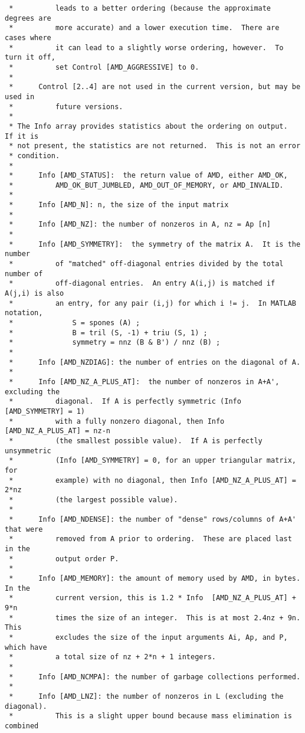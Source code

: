 \documentclass[11pt]{article}
\begin{document}
{\begin{verbatim}
 *          leads to a better ordering (because the approximate degrees are
 *          more accurate) and a lower execution time.  There are cases where
 *          it can lead to a slightly worse ordering, however.  To turn it off,
 *          set Control [AMD_AGGRESSIVE] to 0.
 *
 *      Control [2..4] are not used in the current version, but may be used in
 *          future versions.
 *
 * The Info array provides statistics about the ordering on output.  If it is
 * not present, the statistics are not returned.  This is not an error
 * condition.
 * 
 *      Info [AMD_STATUS]:  the return value of AMD, either AMD_OK,
 *          AMD_OK_BUT_JUMBLED, AMD_OUT_OF_MEMORY, or AMD_INVALID.
 *
 *      Info [AMD_N]: n, the size of the input matrix
 *
 *      Info [AMD_NZ]: the number of nonzeros in A, nz = Ap [n]
 *
 *      Info [AMD_SYMMETRY]:  the symmetry of the matrix A.  It is the number
 *          of "matched" off-diagonal entries divided by the total number of
 *          off-diagonal entries.  An entry A(i,j) is matched if A(j,i) is also
 *          an entry, for any pair (i,j) for which i != j.  In MATLAB notation,
 *              S = spones (A) ;
 *              B = tril (S, -1) + triu (S, 1) ;
 *              symmetry = nnz (B & B') / nnz (B) ;
 *
 *      Info [AMD_NZDIAG]: the number of entries on the diagonal of A.
 *
 *      Info [AMD_NZ_A_PLUS_AT]:  the number of nonzeros in A+A', excluding the
 *          diagonal.  If A is perfectly symmetric (Info [AMD_SYMMETRY] = 1)
 *          with a fully nonzero diagonal, then Info [AMD_NZ_A_PLUS_AT] = nz-n
 *          (the smallest possible value).  If A is perfectly unsymmetric
 *          (Info [AMD_SYMMETRY] = 0, for an upper triangular matrix, for
 *          example) with no diagonal, then Info [AMD_NZ_A_PLUS_AT] = 2*nz
 *          (the largest possible value).
 *
 *      Info [AMD_NDENSE]: the number of "dense" rows/columns of A+A' that were
 *          removed from A prior to ordering.  These are placed last in the
 *          output order P.
 *
 *      Info [AMD_MEMORY]: the amount of memory used by AMD, in bytes.  In the
 *          current version, this is 1.2 * Info  [AMD_NZ_A_PLUS_AT] + 9*n
 *          times the size of an integer.  This is at most 2.4nz + 9n.  This
 *          excludes the size of the input arguments Ai, Ap, and P, which have
 *          a total size of nz + 2*n + 1 integers.
 *
 *      Info [AMD_NCMPA]: the number of garbage collections performed.
 *
 *      Info [AMD_LNZ]: the number of nonzeros in L (excluding the diagonal).
 *          This is a slight upper bound because mass elimination is combined

\end{verbatim}}
\end{document}
